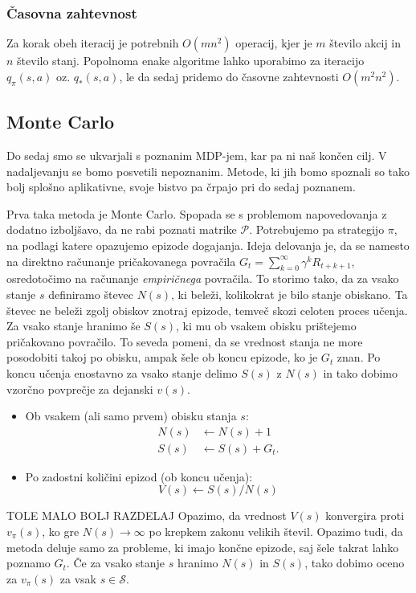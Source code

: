 \documentclass[12pt,a4paper]{amsart}
\theoremstyle{definition} %
\theoremstyle{plain} %
\begin{document}
\subsubsection{Časovna zahtevnost}
Za korak obeh iteracij je potrebnih $O(mn^2)$ operacij, kjer je $m$ število akcij in $n$ število 
stanj. Popolnoma enake algoritme lahko uporabimo za iteracijo $q_\pi(s, a)$ oz. $q_*(s, a)$, le 
da sedaj pridemo do časovne zahtevnosti $O(m^2n^2)$.

\subsection{Monte Carlo}
Do sedaj smo se ukvarjali s poznanim MDP-jem, kar pa ni naš končen cilj. V nadaljevanju se bomo 
posvetili nepoznanim. Metode, ki jih bomo spoznali so tako bolj splošno aplikativne, svoje 
bistvo pa črpajo pri do sedaj poznanem.

Prva taka metoda je Monte Carlo. Spopada se s problemom napovedovanja z dodatno izboljšavo, da 
ne rabi poznati matrike $\mathcal{P}$. Potrebujemo pa strategijo $\pi$, na podlagi katere opazujemo 
epizode dogajanja. Ideja delovanja je, da se namesto na direktno računanje pričakovanega povračila
$G_t = \sum_{k=0}^\infty \gamma^k R_{t + k + 1}$, osredotočimo na računanje \textit{empiričnega} 
povračila. To storimo tako, da za vsako stanje $s$ definiramo števec $N(s)$, ki beleži, kolikokrat 
je bilo stanje obiskano. Ta števec ne beleži zgolj obiskov znotraj epizode, temveč skozi celoten 
proces učenja. Za vsako stanje hranimo še $S(s)$, ki mu ob vsakem obisku prištejemo pričakovano 
povračilo. To seveda pomeni, da se vrednost stanja ne more posodobiti takoj po obisku, ampak šele 
ob koncu epizode, ko je $G_t$ znan. Po koncu učenja enostavno za vsako stanje delimo $S(s)$ z $N(s)$
in tako dobimo vzorčno povprečje za dejanski $v(s)$.

\begin{itemize}
    \item Ob vsakem (ali samo prvem) obisku stanja $s$: 
        \begin{align*}
            N(s) &\leftarrow N(s) + 1 \\
            S(s) &\leftarrow S(s) + G_t.
        \end{align*}
    \item Po zadostni količini epizod (ob koncu učenja): 
        $$
        V(s) \leftarrow S(s) / N(s)
        $$
\end{itemize}
TOLE MALO BOLJ RAZDELAJ
Opazimo, da vrednost $V(s)$ konvergira proti $v_\pi(s)$, ko gre $N(s) \rightarrow \infty$ po 
krepkem zakonu velikih števil. Opazimo tudi, da metoda deluje samo za probleme, ki imajo končne 
epizode, saj šele takrat lahko poznamo $G_t$. Če za vsako stanje $s$ hranimo $N(s)$ in $S(s)$, 
tako dobimo oceno za $v_\pi(s)$ za vsak $s \in \mathcal{S}$.
\end{document}
